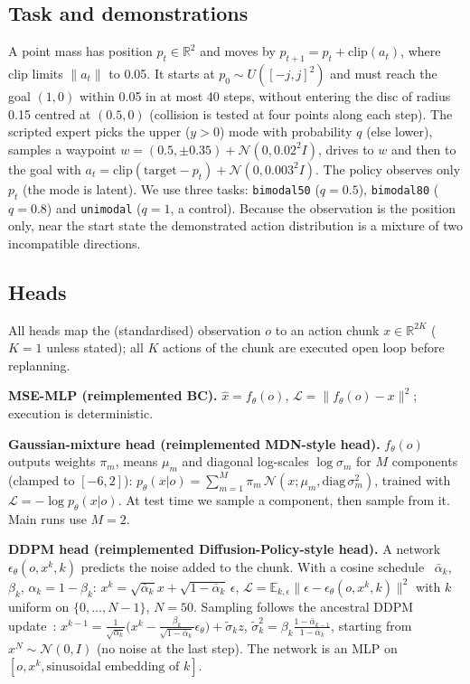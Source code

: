 \subsection{Task and demonstrations}
A point mass has position $p_t\in\mathbb R^2$ and moves by $p_{t+1}=p_t+\mathrm{clip}(a_t)$, where $\mathrm{clip}$ limits $\|a_t\|$ to 0.05. It starts at $p_0\sim U([-j,j]^2)$ and must reach the goal $(1,0)$ within 0.05 in at most 40 steps, without entering the disc of radius 0.15 centred at $(0.5,0)$ (collision is tested at four points along each step). The scripted expert picks the upper ($y>0$) mode with probability $q$ (else lower), samples a waypoint $w=(0.5,\pm0.35)+\mathcal N(0,0.02^2I)$, drives to $w$ and then to the goal with $a_t=\mathrm{clip}(\text{target}-p_t)+\mathcal N(0,0.003^2 I)$. The policy observes only $p_t$ (the mode is latent). We use three tasks: \texttt{bimodal50} ($q=0.5$), \texttt{bimodal80} ($q=0.8$) and \texttt{unimodal} ($q=1$, a control). Because the observation is the position only, near the start state the demonstrated action distribution is a mixture of two incompatible directions.

\subsection{Heads}
All heads map the (standardised) observation $o$ to an action chunk $x\in\mathbb R^{2K}$ ($K=1$ unless stated); all $K$ actions of the chunk are executed open loop before replanning.

\textbf{MSE-MLP (reimplemented BC).} $\hat x=f_\theta(o)$, $\mathcal L=\|f_\theta(o)-x\|^2$; execution is deterministic.

\textbf{Gaussian-mixture head (reimplemented MDN-style head).} $f_\theta(o)$ outputs weights $\pi_m$, means $\mu_m$ and diagonal log-scales $\log\sigma_m$ for $M$ components (clamped to $[-6,2]$): $p_\theta(x|o)=\sum_{m=1}^M\pi_m\,\mathcal N(x;\mu_m,\mathrm{diag}\,\sigma_m^2)$, trained with $\mathcal L=-\log p_\theta(x|o)$. At test time we sample a component, then sample from it. Main runs use $M=2$.

\textbf{DDPM head (reimplemented Diffusion-Policy-style head).} A network $\epsilon_\theta(o,x^k,k)$ predicts the noise added to the chunk. With a cosine schedule~\cite{nichol2021improved} $\bar\alpha_k$, $\beta_k$, $\alpha_k=1-\beta_k$: $x^k=\sqrt{\bar\alpha_k}x+\sqrt{1-\bar\alpha_k}\,\epsilon$, $\mathcal L=\mathbb E_{k,\epsilon}\|\epsilon-\epsilon_\theta(o,x^k,k)\|^2$ with $k$ uniform on $\{0,\dots,N-1\}$, $N=50$. Sampling follows the ancestral DDPM update~\cite{ho2020denoising}: $x^{k-1}=\frac{1}{\sqrt{\alpha_k}}\big(x^k-\frac{\beta_k}{\sqrt{1-\bar\alpha_k}}\epsilon_\theta\big)+\tilde\sigma_k z$, $\tilde\sigma_k^2=\beta_k\frac{1-\bar\alpha_{k-1}}{1-\bar\alpha_k}$, starting from $x^N\sim\mathcal N(0,I)$ (no noise at the last step). The network is an MLP on $[o,x^k,\text{sinusoidal embedding of }k]$.

